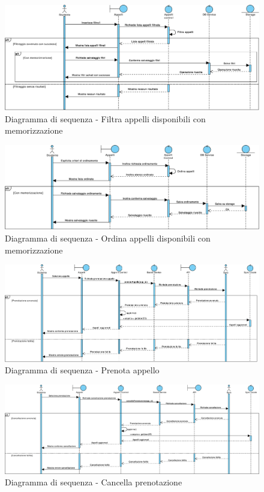 \begin{figure}
	\centering
	\includegraphics[width=6.5in]{imgs/gruppo1/sequence_diagrams/SD9_filtra_appelli_disponibili_con_memorizzazione.pdf}
	\caption{Diagramma di sequenza - Filtra appelli disponibili con memorizzazione}
	\label{diag:filtraAppelliDisponibiliConMemSD}
\end{figure}

\begin{figure}
	\centering
	\includegraphics[width=6.5in]{imgs/gruppo1/sequence_diagrams/SD10_ordina_appelli_disponibili_con_memorizzazione.pdf}
	\caption{Diagramma di sequenza - Ordina appelli disponibili con memorizzazione}
	\label{diag:ordinaAppelliDisponibiliConMemSD}
\end{figure}
\newpage

\begin{figure}
	\centering
	\includegraphics[width=6.5in]{imgs/gruppo1/sequence_diagrams/SD11_prenota_appello.pdf}
	\caption{Diagramma di sequenza - Prenota appello}
	\label{diag:prenotaAppelloSD}
\end{figure}

\begin{figure}
	\centering
	\includegraphics[width=6.5in]{imgs/gruppo1/sequence_diagrams/SD12_cancella_prenotazione.pdf}
	\caption{Diagramma di sequenza - Cancella prenotazione}
	\label{diag:cancellaPrenotazioneSD}
\end{figure}

\clearpage
